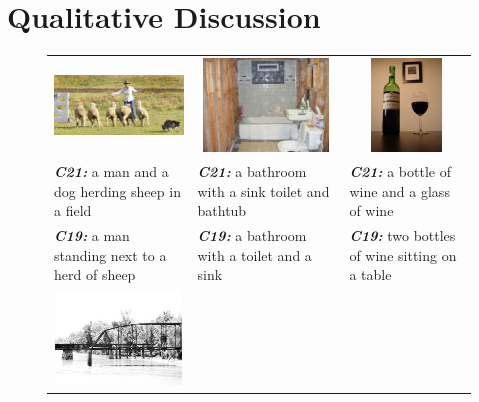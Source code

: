 \section{Qualitative Discussion}
\begin{figure}[bth]
  \begin{center}
  \newcommand{\mcCell}[1]{%
  \multicolumn{1}{c}{#1}}
  \centering
  \begin{adjustbox}{center}
  \tabcolsep=0.05cm
  \begin{tabular}{lll}
    \mcCell{\includegraphics[width=0.24\linewidth,height=2.5cm]{images/COCO_val2014_000000502766.jpg}} &
    \mcCell{\includegraphics[width=0.24\linewidth,height=2.5cm]{images/COCO_val2014_000000161720.jpg}} &
    \mcCell{\includegraphics[width=0.24\linewidth,height=2.5cm]{images/COCO_val2014_000000385707.jpg}} \\
    \textbf{\em\scriptsize C21:} \scriptsize a man and a dog herding sheep in a field &
    \textbf{\em\scriptsize C21:} \scriptsize a bathroom with a sink toilet and bathtub &
    \textbf{\em\scriptsize C21:} \scriptsize a bottle of wine and a glass of wine\\
    \textbf{\em\scriptsize C19:} \scriptsize a man standing next to a herd of sheep&
    \textbf{\em\scriptsize C19:} \scriptsize a bathroom with a toilet and a sink&
    \textbf{\em\scriptsize C19:} \scriptsize two bottles of wine sitting on a table\\
    \mcCell{\includegraphics[width=0.25\linewidth,height=2.5cm]{images/COCO_val2014_000000251330.jpg}} &

\end{tabular}
\end{adjustbox}
\end{center}
\end{figure}

